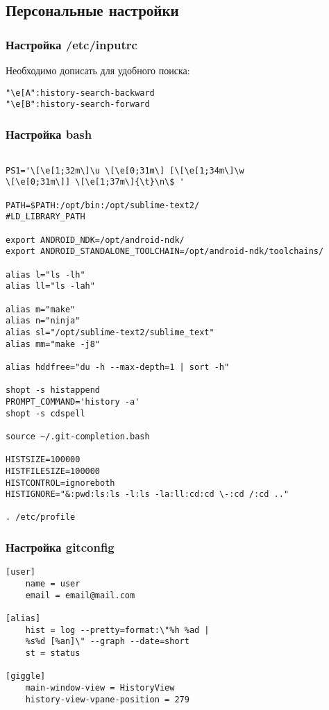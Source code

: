 \documentclass[12pt, a6paper]{article}
\begin{document}
\subsection{Персональные настройки}

\subsubsection{Настройка /etc/inputrc}

Необходимо дописать для удобного поиска:

\begin{verbatim}
"\e[A":history-search-backward
"\e[B":history-search-forward
\end{verbatim}


\subsubsection{Настройка bash}
\begin{verbatim}

PS1='\[\e[1;32m\]\u \[\e[0;31m\] [\[\e[1;34m\]\w 
\[\e[0;31m\]] \[\e[1;37m\]{\t}\n\$ '

PATH=$PATH:/opt/bin:/opt/sublime-text2/
#LD_LIBRARY_PATH

export ANDROID_NDK=/opt/android-ndk/
export ANDROID_STANDALONE_TOOLCHAIN=/opt/android-ndk/toolchains/

alias l="ls -lh"
alias ll="ls -lah"

alias m="make"
alias n="ninja"
alias sl="/opt/sublime-text2/sublime_text"
alias mm="make -j8"

alias hddfree="du -h --max-depth=1 | sort -h"

shopt -s histappend
PROMPT_COMMAND='history -a'
shopt -s cdspell

source ~/.git-completion.bash

HISTSIZE=100000
HISTFILESIZE=100000
HISTCONTROL=ignoreboth
HISTIGNORE="&:pwd:ls:ls -l:ls -la:ll:cd:cd \-:cd /:cd .."

. /etc/profile
\end{verbatim}

\subsubsection{Настройка gitconfig}
\begin{verbatim}
[user]
    name = user
    email = email@mail.com

[alias]
    hist = log --pretty=format:\"%h %ad | 
    %s%d [%an]\" --graph --date=short
    st = status

[giggle]
    main-window-view = HistoryView
    history-view-vpane-position = 279
\end{verbatim}
\end{document}

